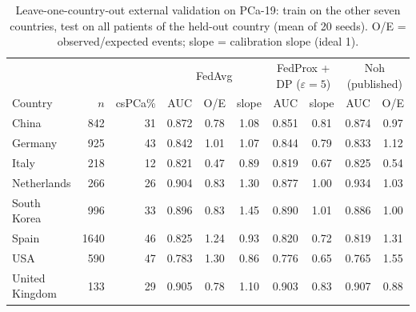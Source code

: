 \begin{table}[t]
\caption{Leave-one-country-out external validation on PCa-19: train on the other seven countries, test on all patients of the held-out country (mean of 20 seeds). O/E = observed/expected events; slope = calibration slope (ideal 1).}
\centering\small
\begin{tabular}{lrrccccccc}
\toprule
& & & \multicolumn{3}{c}{FedAvg} & \multicolumn{2}{c}{FedProx + DP ($\varepsilon=5$)} & \multicolumn{2}{c}{Noh (published)} \\
Country & $n$ & csPCa\% & AUC & O/E & slope & AUC & slope & AUC & O/E \\
\midrule
China & 842 & 31 & 0.872 & 0.78 & 1.08 & 0.851 & 0.81 & 0.874 & 0.97 \\
Germany & 925 & 43 & 0.842 & 1.01 & 1.07 & 0.844 & 0.79 & 0.833 & 1.12 \\
Italy & 218 & 12 & 0.821 & 0.47 & 0.89 & 0.819 & 0.67 & 0.825 & 0.54 \\
Netherlands & 266 & 26 & 0.904 & 0.83 & 1.30 & 0.877 & 1.00 & 0.934 & 1.03 \\
South Korea & 996 & 33 & 0.896 & 0.83 & 1.45 & 0.890 & 1.01 & 0.886 & 1.00 \\
Spain & 1640 & 46 & 0.825 & 1.24 & 0.93 & 0.820 & 0.72 & 0.819 & 1.31 \\
USA & 590 & 47 & 0.783 & 1.30 & 0.86 & 0.776 & 0.65 & 0.765 & 1.55 \\
United Kingdom & 133 & 29 & 0.905 & 0.78 & 1.10 & 0.903 & 0.83 & 0.907 & 0.88 \\
\bottomrule
\end{tabular}
\label{tab:pca19_loco}
\end{table}
